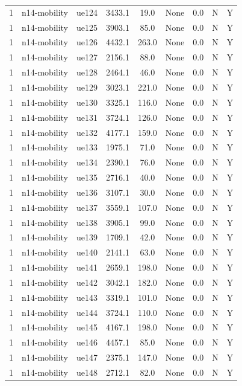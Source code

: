 \begin{table}[ht]
\begin{tabular}{|c|c|c|c|c|c|c|c|c|}
1 & n14-mobility & ue124 & 3433.1 & 19.0 & None & 0.0 & N & Y \\
1 & n14-mobility & ue125 & 3903.1 & 85.0 & None & 0.0 & N & Y \\
1 & n14-mobility & ue126 & 4432.1 & 263.0 & None & 0.0 & N & Y \\
1 & n14-mobility & ue127 & 2156.1 & 88.0 & None & 0.0 & N & Y \\
1 & n14-mobility & ue128 & 2464.1 & 46.0 & None & 0.0 & N & Y \\
1 & n14-mobility & ue129 & 3023.1 & 221.0 & None & 0.0 & N & Y \\
1 & n14-mobility & ue130 & 3325.1 & 116.0 & None & 0.0 & N & Y \\
1 & n14-mobility & ue131 & 3724.1 & 126.0 & None & 0.0 & N & Y \\
1 & n14-mobility & ue132 & 4177.1 & 159.0 & None & 0.0 & N & Y \\
1 & n14-mobility & ue133 & 1975.1 & 71.0 & None & 0.0 & N & Y \\
1 & n14-mobility & ue134 & 2390.1 & 76.0 & None & 0.0 & N & Y \\
1 & n14-mobility & ue135 & 2716.1 & 40.0 & None & 0.0 & N & Y \\
1 & n14-mobility & ue136 & 3107.1 & 30.0 & None & 0.0 & N & Y \\
1 & n14-mobility & ue137 & 3559.1 & 107.0 & None & 0.0 & N & Y \\
1 & n14-mobility & ue138 & 3905.1 & 99.0 & None & 0.0 & N & Y \\
1 & n14-mobility & ue139 & 1709.1 & 42.0 & None & 0.0 & N & Y \\
1 & n14-mobility & ue140 & 2141.1 & 63.0 & None & 0.0 & N & Y \\
1 & n14-mobility & ue141 & 2659.1 & 198.0 & None & 0.0 & N & Y \\
1 & n14-mobility & ue142 & 3042.1 & 182.0 & None & 0.0 & N & Y \\
1 & n14-mobility & ue143 & 3319.1 & 101.0 & None & 0.0 & N & Y \\
1 & n14-mobility & ue144 & 3724.1 & 110.0 & None & 0.0 & N & Y \\
1 & n14-mobility & ue145 & 4167.1 & 198.0 & None & 0.0 & N & Y \\
1 & n14-mobility & ue146 & 4457.1 & 85.0 & None & 0.0 & N & Y \\
1 & n14-mobility & ue147 & 2375.1 & 147.0 & None & 0.0 & N & Y \\
1 & n14-mobility & ue148 & 2712.1 & 82.0 & None & 0.0 & N & Y \\

\end{tabular}
\end{table}
